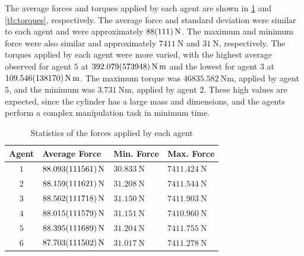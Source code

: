 The average forces and torques applied by each agent are shown in \cref{tb:forces} and \cref{tb:torques}, respectively. The average force and standard deviation were similar to each agent and were approximately $\qty{88 \pm 111}{\newton}$. The maximum and minimum force were also similar and approximately $\qty{7411}{\newton}$ and $\qty{31}{\newton}$, respectively. The torques applied by each agent were more varied, with the highest average observed for agent $5$ at $\qty{392.079 \pm 573.948}{\newton\meter}$ and the lowest for agent $3$ at $\qty{109.546 \pm 138.17}{\newton\meter}$. The maximum torque was $\qty{46835.582}{\newton\meter}$, applied by agent $5$, and the minimum was $\qty{3.731}{\newton\meter}$, applied by agent $2$. These high values are expected, since the cylinder has a large mass and dimensions, and the agents perform a complex manipulation task in minimum time.
\begin{table}[ht]
    \centering
    \caption{Statistics of the forces applied by each agent}\label{tb:forces}
    \begin{tabular}{clll}
    Agent & Average Force & Min. Force & Max. Force\\\hline
    $1$ & $\qty{88.093 \pm 111.561}{\newton}$ & $\qty{30.833}{\newton}$ & $\qty{7411.424}{\newton}$ \\
    $2$ & $\qty{88.159 \pm 111.621}{\newton}$ & $\qty{31.208}{\newton}$ & $\qty{7411.544}{\newton}$ \\
    $3$ & $\qty{88.562 \pm 111.718}{\newton}$ & $\qty{31.150}{\newton}$ & $\qty{7411.903}{\newton}$ \\
    $4$ & $\qty{88.015 \pm 111.579}{\newton}$ & $\qty{31.151}{\newton}$ & $\qty{7410.960}{\newton}$ \\
    $5$ & $\qty{88.395 \pm 111.689}{\newton}$ & $\qty{31.204}{\newton}$ & $\qty{7411.755}{\newton}$ \\
    $6$ & $\qty{87.703 \pm 111.502}{\newton}$ & $\qty{31.017}{\newton}$ & $\qty{7411.278}{\newton}$
    \\\hline
    \end{tabular}
\end{table}
